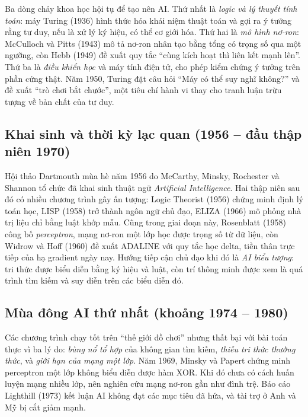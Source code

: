 Ba dòng chảy khoa học hội tụ để tạo nên AI. Thứ nhất là \emph{logic và lý thuyết tính toán}: máy Turing (1936) hình thức hóa khái niệm thuật toán và gợi ra ý tưởng rằng tư duy, nếu là xử lý ký hiệu, có thể cơ giới hóa. Thứ hai là \emph{mô hình nơ-ron}: McCulloch và Pitts (1943) \cite{mcculloch1943} mô tả nơ-ron nhân tạo bằng tổng có trọng số qua một ngưỡng, còn Hebb (1949) đề xuất quy tắc ``cùng kích hoạt thì liên kết mạnh lên''. Thứ ba là \emph{điều khiển học} và máy tính điện tử, cho phép kiểm chứng ý tưởng trên phần cứng thật. Năm 1950, Turing \cite{turing1950} đặt câu hỏi ``Máy có thể suy nghĩ không?'' và đề xuất ``trò chơi bắt chước'', một tiêu chí hành vi thay cho tranh luận trừu tượng về bản chất của tư duy.

\subsection{Khai sinh và thời kỳ lạc quan (1956 – đầu thập niên 1970)}

Hội thảo Dartmouth mùa hè năm 1956 do McCarthy, Minsky, Rochester và Shannon tổ chức \cite{mccarthy1955} đã khai sinh thuật ngữ \emph{Artificial Intelligence}. Hai thập niên sau đó có nhiều chương trình gây ấn tượng: Logic Theorist (1956) chứng minh định lý toán học, LISP (1958) trở thành ngôn ngữ chủ đạo, ELIZA (1966) mô phỏng nhà trị liệu chỉ bằng luật khớp mẫu. Cũng trong giai đoạn này, Rosenblatt (1958) \cite{rosenblatt1958} công bố \emph{perceptron}, mạng nơ-ron một lớp học được trọng số từ dữ liệu, còn Widrow và Hoff (1960) \cite{widrow1960} đề xuất ADALINE với quy tắc học delta, tiền thân trực tiếp của hạ gradient ngày nay. Hướng tiếp cận chủ đạo khi đó là \emph{AI biểu tượng}: tri thức được biểu diễn bằng ký hiệu và luật, còn trí thông minh được xem là quá trình tìm kiếm và suy diễn trên các biểu diễn đó.

\subsection{Mùa đông AI thứ nhất (khoảng 1974 – 1980)}

Các chương trình chạy tốt trên ``thế giới đồ chơi'' nhưng thất bại với bài toán thực vì ba lý do: \emph{bùng nổ tổ hợp} của không gian tìm kiếm, \emph{thiếu tri thức thường thức}, và \emph{giới hạn của mạng một lớp}. Năm 1969, Minsky và Papert \cite{minsky1969} chứng minh perceptron một lớp không biểu diễn được hàm XOR. Khi đó chưa có cách huấn luyện mạng nhiều lớp, nên nghiên cứu mạng nơ-ron gần như đình trệ. Báo cáo Lighthill (1973) \cite{lighthill1973} kết luận AI không đạt các mục tiêu đã hứa, và tài trợ ở Anh và Mỹ bị cắt giảm mạnh.

